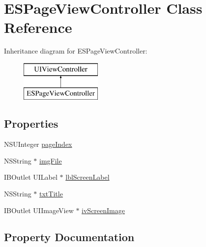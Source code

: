 \hypertarget{interface_e_s_page_view_controller}{}\section{E\+S\+Page\+View\+Controller Class Reference}
\label{interface_e_s_page_view_controller}
Inheritance diagram for E\+S\+Page\+View\+Controller\+:\begin{figure}[H]
\begin{center}
\leavevmode
\includegraphics[height=2.000000cm]{interface_e_s_page_view_controller}
\end{center}
\end{figure}
\subsection*{Properties}
\begin{DoxyCompactItemize}
\item 
N\+S\+U\+Integer \hyperlink{interface_e_s_page_view_controller_acd8b6a09ffbec0851c2a21f82ff4cb59}{page\+Index}
\item 
N\+S\+String $\ast$ \hyperlink{interface_e_s_page_view_controller_ac2b73c2572d8221b108e2c7a79d7e4eb}{img\+File}
\item 
I\+B\+Outlet U\+I\+Label $\ast$ \hyperlink{interface_e_s_page_view_controller_a37a2106faf34602108ad2d3303ab8bdc}{lbl\+Screen\+Label}
\item 
N\+S\+String $\ast$ \hyperlink{interface_e_s_page_view_controller_a6bdeac95e5afc8ef09c069a9d32e80bc}{txt\+Title}
\item 
I\+B\+Outlet U\+I\+Image\+View $\ast$ \hyperlink{interface_e_s_page_view_controller_af89fee72967118c2b6223647191cf380}{iv\+Screen\+Image}
\end{DoxyCompactItemize}


\subsection{Property Documentation}
\hypertarget{interface_e_s_page_view_controller_ac2b73c2572d8221b108e2c7a79d7e4eb}{}
